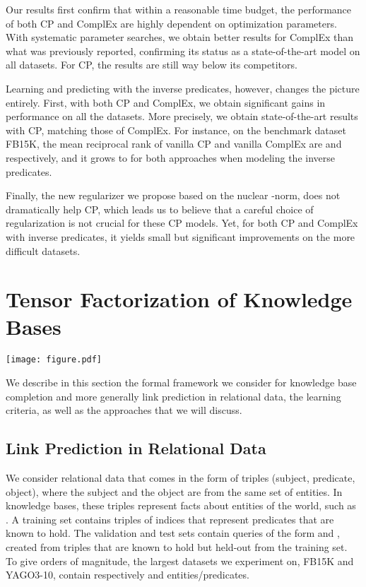 \documentclass{article}
\newcommand{\CP}{{CP}\xspace}
\newcommand{\complex}{{ComplEx}\xspace}
\newcommand{\fb}{{FB15K}\xspace}
\newcommand{\yago}{{YAGO3-10}\xspace}
\begin{document}
Our results first confirm that within a reasonable time budget, the performance of both \CP and \complex are highly dependent on optimization parameters. With systematic parameter searches, we obtain better results for \complex than what was previously reported, confirming its status as a state-of-the-art model on all datasets. For \CP, the results are still way below its competitors. 

Learning and predicting with the inverse predicates, however, changes the picture entirely. First, with both \CP and \complex, we obtain significant gains in performance on all the datasets. More precisely, we obtain state-of-the-art results with \CP, matching those of \complex. For instance, on the benchmark dataset \fb \citep{bordes_translating_2013}, the mean reciprocal rank of vanilla \CP and vanilla \complex are  and  respectively, and it grows to  for both approaches when modeling the inverse predicates. 

Finally, the new regularizer we propose based on the nuclear -norm, does not dramatically help \CP, which leads us to believe that a careful choice of regularization is not crucial for these \CP models. Yet, for both \CP and \complex with inverse predicates, it yields small but significant improvements on the more difficult datasets.

\section{Tensor Factorization of Knowledge Bases}
\begin{figure*}
\centering
\texttt{[image: figure.pdf]}
\caption{(a) On the left, the link between the score of a triple (i,j,k) and the tensor estimated via \CP. (b) In the middle, the two type of fiber losses that we will consider. (c) On the right, our semantically invariant reformulation, the first-mode fibers become third-mode fibers of the reciprocal half of the tensor.}
\label{fig:tensors}
\end{figure*}
We describe in this section the formal framework we consider for knowledge base completion and more generally link prediction in relational data, the learning criteria, as well as the approaches that we will discuss.

\subsection{Link Prediction in Relational Data}
We consider relational data that comes in the form of triples (subject, predicate, object), where the subject and the object are from the same set of entities. In knowledge bases, these triples represent facts about entities of the world, such as . A training set  contains triples of indices  that represent predicates that are known to hold. The validation and test sets contain queries of the form  and , created from triples  that are known to hold but held-out from the training set. To give orders of magnitude, the largest datasets we experiment on, \fb and \yago, contain respectively  and  entities/predicates.
\end{document}
